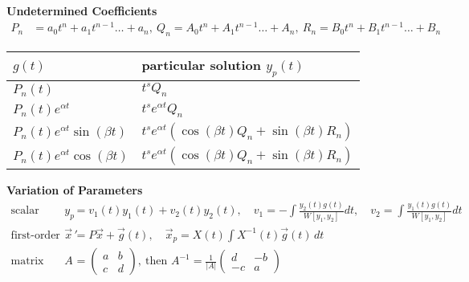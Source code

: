 \begin{center}
    \textbf{Undetermined Coefficients} 
        \vspace{-6pt}
    \begin{align*}
        P_n &= a_0t^n + a_1t^{n-1} \ldots + a_n, \
        Q_n = A_0t^n + A_1t^{n-1} \ldots + A_n, \       
        R_n = B_0t^n + B_1t^{n-1} \ldots + B_n     
    \end{align*}\vspace{-0.4cm}\setlength{\extrarowheight}{0.05cm}
    \begin{tabular}{ p{3.9cm} p{5cm} }
        $g(t)$ &  particular solution $y_p(t)$ 
        \\[2pt] \hline $P_n(t)$  & $t^s Q_n$   \\        
        $P_n(t)e^{\alpha t}$ &  $t^s e^{\alpha t}Q_n$\\       
        $P_n(t)e^{\alpha t}\sin(\beta t)$ & $t^s e^{\alpha t} \left(\cos(\beta t)Q_n+\sin(\beta t) R_n\right)$\\
        $P_n(t)e^{\alpha t}\cos(\beta t)$ & $t^s e^{\alpha t} \left(\cos(\beta t)Q_n+\sin(\beta t) R_n\right)$\\[2pt] \hline
    \end{tabular}
    \setlength{\extrarowheight}{0.0cm}

    \vspace{15pt}
    \textbf{Variation of Parameters}    
        \vspace{-0.2cm}
    \begin{align*}
        \text{scalar form: } y_p &= v_1 (t) y_1(t) + v_2(t) y_2(t) , \quad 
        v_1 = - \int \frac{y_2(t)g(t)}{W[y_1,y_2]}dt , \quad 
        v_2 = \int \frac{y_1(t)g(t)}{W[y_1,y_2]} dt \\
        \text{first-order system: }\vec x \, ' &= P \vec x + \vec g(t), \quad \vec x_p = X(t) \int X^{-1}(t) \vec g(t) \, dt \\
         \text{matrix inverse: if } A &= \begin{pmatrix} a& b\\c&d\end{pmatrix}, \ \text{then } A^{-1} = \frac{1}{|A|}\begin{pmatrix} d&-b\\-c&a\end{pmatrix}
    \end{align*}        
    
\end{center}


\def\dm{\displaystyle}

